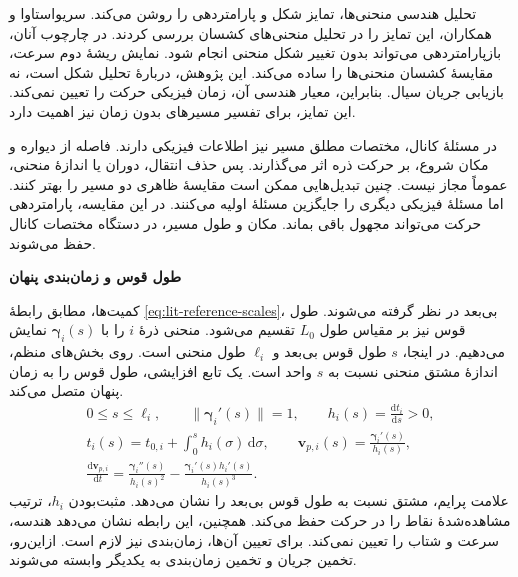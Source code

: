 تحلیل هندسی منحنی‌ها، تمایز شکل و پارامتردهی را روشن می‌کند.
سریواستاوا و همکاران، این تمایز را در تحلیل منحنی‌های کشسان بررسی کردند.
در چارچوب آنان، بازپارامتردهی می‌تواند بدون تغییر شکل منحنی انجام شود.
نمایش ریشهٔ دوم سرعت، مقایسهٔ کشسان منحنی‌ها را ساده می‌کند.
این پژوهش، دربارهٔ تحلیل شکل است، نه بازیابی جریان سیال.
بنابراین، معیار هندسی آن، زمان فیزیکی حرکت را تعیین نمی‌کند.
این تمایز، برای تفسیر مسیرهای بدون زمان نیز اهمیت دارد.
\cite{Srivastava2011ElasticCurves}

در مسئلهٔ کانال، مختصات مطلق مسیر نیز اطلاعات فیزیکی دارند.
فاصله از دیواره و مکان شروع، بر حرکت ذره اثر می‌گذارند.
پس حذف انتقال، دوران یا اندازهٔ منحنی، عموماً مجاز نیست.
چنین تبدیل‌هایی ممکن است مقایسهٔ ظاهری دو مسیر را بهتر کنند.
اما مسئلهٔ فیزیکی دیگری را جایگزین مسئلهٔ اولیه می‌کنند.
در این مقایسه، پارامتردهی حرکت می‌تواند مجهول باقی بماند.
مکان و طول مسیر، در دستگاه مختصات کانال حفظ می‌شوند.

\textbf{طول قوس و زمان‌بندی پنهان}

کمیت‌ها، مطابق رابطهٔ \ref{eq:lit-reference-scales}، بی‌بعد در نظر گرفته می‌شوند.
طول قوس نیز بر مقیاس طول $L_0$ تقسیم می‌شود.
منحنی ذرهٔ $i$ را با $\boldsymbol\gamma_i(s)$ نمایش می‌دهیم.
در اینجا، $s$ طول قوس بی‌بعد و $\ell_i$ طول منحنی است.
روی بخش‌های منظم، اندازهٔ مشتق منحنی نسبت به $s$ واحد است.
یک تابع افزایشی، طول قوس را به زمان پنهان متصل می‌کند.
\begin{equation}
\begin{gathered}
0\le s\le\ell_i,\qquad
\|\boldsymbol\gamma_i'(s)\|=1,\qquad
h_i(s)=\frac{\mathrm dt_i}{\mathrm ds}>0,\\
t_i(s)=t_{0,i}+\int_0^s h_i(\sigma)\,\mathrm d\sigma,\qquad
\mathbf v_{p,i}(s)=\frac{\boldsymbol\gamma_i'(s)}{h_i(s)},\\
\frac{\mathrm d\mathbf v_{p,i}}{\mathrm dt}
=\frac{\boldsymbol\gamma_i''(s)}{h_i(s)^2}
-\frac{\boldsymbol\gamma_i'(s)h_i'(s)}{h_i(s)^3}.
\end{gathered}
\label{eq:lit-untimed-clock}
\end{equation}
علامت پرایم، مشتق نسبت به طول قوس بی‌بعد را نشان می‌دهد.
مثبت‌بودن $h_i$، ترتیب مشاهده‌شدهٔ نقاط را در حرکت حفظ می‌کند.
همچنین، این رابطه نشان می‌دهد هندسه، سرعت و شتاب را تعیین نمی‌کند.
برای تعیین آن‌ها، زمان‌بندی نیز لازم است.
ازاین‌رو، تخمین جریان و تخمین زمان‌بندی به یکدیگر وابسته می‌شوند.


